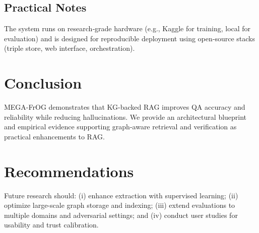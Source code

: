 \documentclass[12pt,a4paper,onecolumn]{article}
\begin{document}
\subsection*{Practical Notes}
The system runs on research‑grade hardware (e.g., Kaggle for training, local for evaluation) and is designed for reproducible deployment using open‑source stacks (triple store, web interface, orchestration).

\section*{Conclusion}
MEGA-FrOG demonstrates that KG-backed RAG improves QA accuracy and reliability while reducing hallucinations. We provide an architectural blueprint and empirical evidence supporting graph-aware retrieval and verification as practical enhancements to RAG.

\section*{Recommendations}
Future research should: (i) enhance extraction with supervised learning; (ii) optimize large-scale graph storage and indexing; (iii) extend evaluations to multiple domains and adversarial settings; and (iv) conduct user studies for usability and trust calibration.
\end{document}
